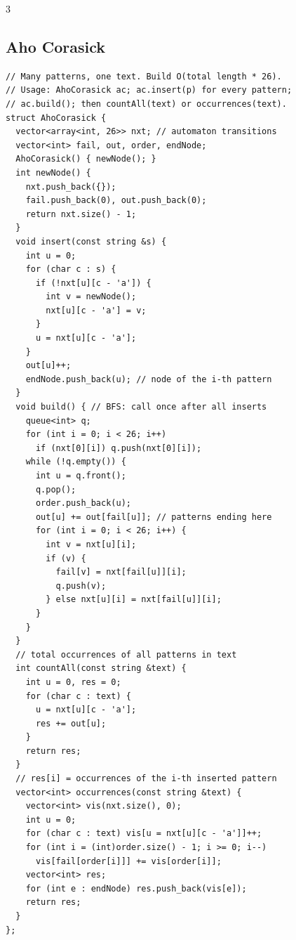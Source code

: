 \documentclass[8pt, a4paper]{article}
\begin{document}
\begin{multicols*}{3}
\subsection{Aho Corasick}
\begin{lstlisting}
// Many patterns, one text. Build O(total length * 26).
// Usage: AhoCorasick ac; ac.insert(p) for every pattern;
// ac.build(); then countAll(text) or occurrences(text).
struct AhoCorasick {
  vector<array<int, 26>> nxt; // automaton transitions
  vector<int> fail, out, order, endNode;
  AhoCorasick() { newNode(); }
  int newNode() {
    nxt.push_back({});
    fail.push_back(0), out.push_back(0);
    return nxt.size() - 1;
  }
  void insert(const string &s) {
    int u = 0;
    for (char c : s) {
      if (!nxt[u][c - 'a']) {
        int v = newNode();
        nxt[u][c - 'a'] = v;
      }
      u = nxt[u][c - 'a'];
    }
    out[u]++;
    endNode.push_back(u); // node of the i-th pattern
  }
  void build() { // BFS: call once after all inserts
    queue<int> q;
    for (int i = 0; i < 26; i++)
      if (nxt[0][i]) q.push(nxt[0][i]);
    while (!q.empty()) {
      int u = q.front();
      q.pop();
      order.push_back(u);
      out[u] += out[fail[u]]; // patterns ending here
      for (int i = 0; i < 26; i++) {
        int v = nxt[u][i];
        if (v) {
          fail[v] = nxt[fail[u]][i];
          q.push(v);
        } else nxt[u][i] = nxt[fail[u]][i];
      }
    }
  }
  // total occurrences of all patterns in text
  int countAll(const string &text) {
    int u = 0, res = 0;
    for (char c : text) {
      u = nxt[u][c - 'a'];
      res += out[u];
    }
    return res;
  }
  // res[i] = occurrences of the i-th inserted pattern
  vector<int> occurrences(const string &text) {
    vector<int> vis(nxt.size(), 0);
    int u = 0;
    for (char c : text) vis[u = nxt[u][c - 'a']]++;
    for (int i = (int)order.size() - 1; i >= 0; i--)
      vis[fail[order[i]]] += vis[order[i]];
    vector<int> res;
    for (int e : endNode) res.push_back(vis[e]);
    return res;
  }
};
\end{lstlisting}

\end{multicols*}
\end{document}
